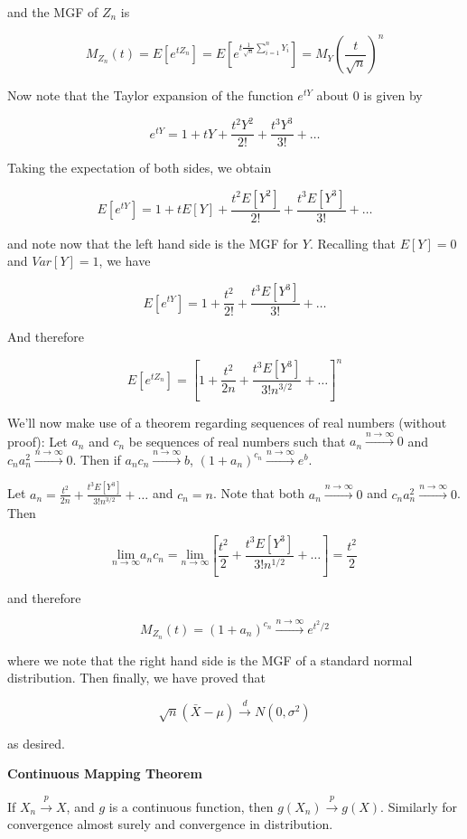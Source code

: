 \documentclass[
  letterpaper,
  DIV=11,
  numbers=noendperiod]{scrreprt}
\begin{document}
and the MGF of \(Z_n\) is

\[
M_{Z_n}(t) = E[e^{tZ_n}] = E[e^{t\frac{1}{\sqrt{n}}\sum_{i = 1}^n Y_i}] = M_Y\left(\frac{t}{\sqrt{n}}\right)^n
\]

Now note that the Taylor expansion of the function \(e^{tY}\) about
\(0\) is given by

\[
e^{tY} = 1 + tY + \frac{t^2Y^2}{2!} + \frac{t^3Y^3}{3!} + \dots
\]

Taking the expectation of both sides, we obtain

\[
E[e^{tY}] = 1 + tE[Y] + \frac{t^2E[Y^2]}{2!} + \frac{t^3E[Y^3]}{3!} + \dots
\]

and note now that the left hand side is the MGF for \(Y\). Recalling
that \(E[Y] = 0\) and \(Var[Y] = 1\), we have

\[
E[e^{tY}] = 1  + \frac{t^2}{2!} + \frac{t^3E[Y^3]}{3!} + \dots
\]

And therefore

\[
E[e^{tZ_n}] = \left[1  + \frac{t^2}{2n} + \frac{t^3E[Y^3]}{3!n^{3/2}} + \dots \right]^n
\]

We'll now make use of a theorem regarding sequences of real numbers
(without proof): Let \(a_n\) and \(c_n\) be sequences of real numbers
such that \(a_n \overset{n \to \infty}{\to} 0\) and
\(c_na_n^2 \overset{n \to \infty}{\to} 0\). Then if
\(a_nc_n \overset{n \to \infty}{\to} b\),
\((1 + a_n)^{c_n} \overset{n \to \infty}{\to} e^b\).

Let \(a_n = \frac{t^2}{2n} + \frac{t^3E[Y^3]}{3!n^{3/2}} + \dots\) and
\(c_n = n\). Note that both \(a_n \overset{n \to \infty}{\to} 0\) and
\(c_na_n^2 \overset{n \to \infty}{\to} 0\). Then

\[
\underset{n \to \infty}{\text{lim}} a_n c_n = \underset{n \to \infty}{\text{lim}} \left[ \frac{t^2}{2} + \frac{t^3E[Y^3]}{3!n^{1/2}} + \dots\right] = \frac{t^2}{2}
\]

and therefore

\[
M_{Z_n}(t) = (1 + a_n)^{c_n} \overset{n \to \infty}{\to} e^{t^2/2}
\]

where we note that the right hand side is the MGF of a standard normal
distribution. Then finally, we have proved that

\[
\sqrt{n}(\bar{X} - \mu) \overset{d}{\to} N(0, \sigma^2)
\]

as desired.

\textbf{Continuous Mapping Theorem}

If \(X_n \overset{p}{\to} X\), and \(g\) is a continuous function, then
\(g(X_n) \overset{p}{\to} g(X)\). Similarly for convergence almost
surely and convergence in distribution.
\end{document}
